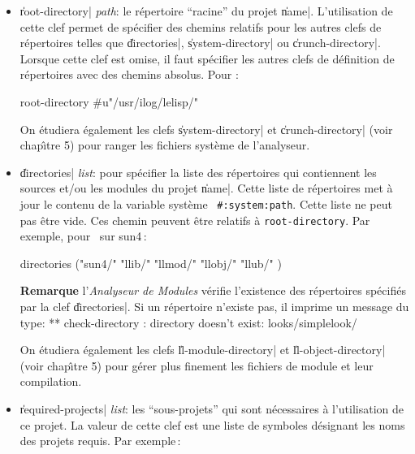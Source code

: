 \begin{itemize}

\item {\Large \|root-directory| {\em path}}: le r\'{e}pertoire ``racine{''} 
du projet \|name|. L'utilisation de cette clef
permet de sp\'{e}cifier des chemins relatifs pour les autres clefs de
r\'{e}pertoires telles que \|directories|, \|system-directory| ou
\|crunch-directory|. 
Lorsque cette clef est omise, il faut sp\'{e}cifier les autres clefs de
d\'{e}finition de r\'{e}pertoires
avec des chemins absolus. Pour \LeLisp :

\begin{Code*}
  root-directory #u"/usr/ilog/lelisp/"
\end{Code*}

On \'{e}tudiera \'{e}galement les clefs \|system-directory| et
\|crunch-directory| (voir chap\^{\i}tre 5) pour ranger les fichiers
syst\`{e}me de l'analyseur.

\item {\Large \|directories| {\em list}}: pour sp\'{e}cifier la liste des
r\'{e}pertoires qui contiennent les sources et/ou les modules du projet
\|name|. 
Cette liste de r\'{e}pertoires met \`{a} jour le contenu de la
variable syst\`{e}me \LeLisp\ {\tt \#:system:path}. Cette liste ne peut
pas \^{e}tre vide. Ces chemin peuvent \^{e}tre relatifs \`{a} {\tt root-directory}.
Par exemple, 
pour \LeLisp\ sur sun4\,:

\begin{Code*}
  directories ("sun4/"
               "llib/"
               "llmod/"
               "llobj/"
               "llub/"
               )
\end{Code*}

\begin{Side}{\bf Remarque}
l'{\em Analyseur de Modules} v\'{e}rifie l'existence des
r\'{e}pertoires sp\'{e}cifi\'{e}s par la clef \|directories|. 
Si un r\'{e}pertoire n'existe pas, il imprime un message du
type:
\BeginLL
** check-directory : directory doesn't exist: looks/simplelook/
\EndLL
\end{Side}

On \'{e}tudiera \'{e}galement les clefs \|ll-module-directory| et
\|ll-object-directory| (voir chap\^{\i}tre 5) pour g\'{e}rer plus finement
les fichiers de 
module et leur compilation.

\item {\Large \|required-projects| {\em list}}: les
``sous-projets{''} qui sont 
n\'{e}cessaires \`{a} l'utilisation de ce projet. La valeur de cette clef
est une liste de symboles d\'{e}signant les noms des projets requis. Par
exemple\,:


\end{itemize}
